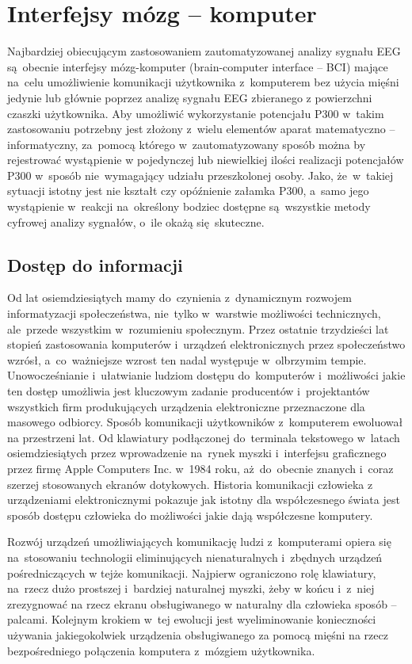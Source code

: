 \documentclass[licencjacka,openright]{pracamgr}
\begin{document}
\section{Interfejsy mózg -- komputer}
Najbardziej obiecującym zastosowaniem zautomatyzowanej analizy sygnału EEG są~obecnie interfejsy mózg-komputer (brain-computer interface -- BCI) mające na~celu umożliwienie komunikacji użytkownika z~komputerem bez użycia mięśni jedynie lub głównie poprzez analizę sygnału EEG zbieranego z powierzchni czaszki użytkownika. Aby umożliwić wykorzystanie potencjału P300 w~takim zastosowaniu potrzebny jest złożony z~wielu elementów aparat matematyczno -- informatyczny, za~pomocą którego w~zautomatyzowany sposób można by rejestrować wystąpienie w pojedynczej lub niewielkiej ilości realizacji potencjałów P300 w~sposób nie~wymagający udziału przeszkolonej osoby. Jako, że~w~takiej sytuacji istotny jest nie kształt czy opóźnienie załamka P300, a~samo jego wystąpienie w~reakcji na~określony bodziec dostępne są~wszystkie metody cyfrowej analizy sygnałów, o~ile okażą się~skuteczne.

\subsection{Dostęp do informacji}
Od lat osiemdziesiątych mamy do~czynienia z~dynamicznym rozwojem informatyzacji społeczeństwa, nie~tylko w~warstwie możliwości technicznych, ale~przede wszystkim w~rozumieniu społecznym. Przez ostatnie trzydzieści lat stopień zastosowania komputerów i~urządzeń elektronicznych przez społeczeństwo wzrósł, a~co~ważniejsze wzrost ten nadal występuje w~olbrzymim tempie. Unowocześnianie i~ułatwianie ludziom dostępu do~komputerów i~możliwości jakie ten dostęp umożliwia jest kluczowym zadanie producentów i~projektantów wszystkich firm produkujących urządzenia elektroniczne przeznaczone dla masowego odbiorcy. Sposób komunikacji użytkowników z~komputerem ewoluował na przestrzeni lat. Od klawiatury podłączonej do~terminala tekstowego w~latach osiemdziesiątych przez wprowadzenie na~rynek myszki i~interfejsu graficznego przez firmę Apple Computers Inc. w~1984 roku, aż~do~obecnie znanych i~coraz szerzej stosowanych ekranów dotykowych. Historia komunikacji człowieka z urządzeniami elektronicznymi pokazuje jak istotny dla współczesnego świata jest sposób dostępu człowieka do możliwości jakie dają współczesne komputery.

Rozwój urządzeń umożliwiających komunikację ludzi z~komputerami opiera się na~stosowaniu technologii eliminujących nienaturalnych i~zbędnych urządzeń pośredniczących w tejże komunikacji. Najpierw ograniczono rolę klawiatury, na~rzecz dużo prostszej i~bardziej naturalnej myszki, żeby w końcu i~z~niej zrezygnować na rzecz ekranu obsługiwanego w naturalny dla człowieka sposób -- palcami. Kolejnym krokiem w~tej ewolucji jest wyeliminowanie konieczności używania jakiegokolwiek urządzenia obsługiwanego za pomocą mięśni na rzecz bezpośredniego połączenia komputera z~mózgiem użytkownika.
\end{document}
